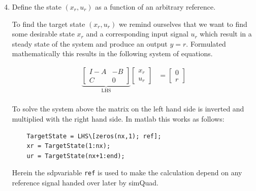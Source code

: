 \documentclass[11pt]{article}
\begin{document}
\begin{enumerate}
    \setcounter{enumi}{3}
    \item Define the state $(x_r,u_r)$ as a function of an arbitrary reference.
    
    To find the target state $(x_r,u_r)$ we remind ourselves that we want to find some desirable state $x_r$ and a corresponding input signal $u_r$ which result in a steady state of the system and produce an output $y=r$. Formulated mathematically this results in the following system of equations.
    
    \begin{align}
    \underbrace{\begin{bmatrix}I-A&-B\\C&0\end{bmatrix}}_{\text{LHS}}\begin{bmatrix}x_r\\u_r\end{bmatrix}&=\begin{bmatrix}0\\r\end{bmatrix}\\
    \end{align}
    
    To solve the system above the matrix on the left hand side is inverted and multiplied with the right hand side. In matlab this works as follows:
    
    \begin{verbatim}
    TargetState = LHS\[zeros(nx,1); ref];
    xr = TargetState(1:nx);
    ur = TargetState(nx+1:end);
    \end{verbatim}
    
    Herein the sdpvariable \verb|ref| is used to make the calculation depend on any reference signal handed over later by simQuad.


\end{enumerate}
\end{document}

